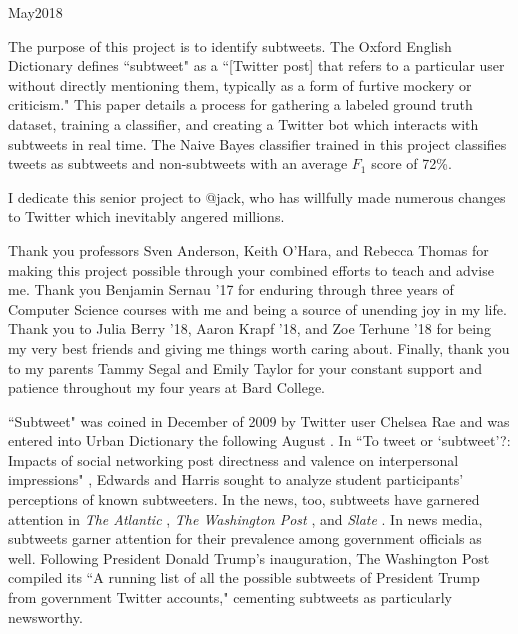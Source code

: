 \documentclass[11pt, twoside, reqno]{book}
\begin{document}
    {May}{2018}

\abstr

The purpose of this project is to identify subtweets. The Oxford English Dictionary defines ``subtweet" as a ``[Twitter post] that refers to a particular user without directly mentioning them, typically as a form of furtive mockery or criticism." This paper details a process for gathering a labeled ground truth dataset, training a classifier, and creating a Twitter bot which interacts with subtweets in real time. The Naive Bayes classifier trained in this project classifies tweets as subtweets and non-subtweets with an average $F_{1}$ score of 72\%. 

\tableofcontents

\dedic

I dedicate this senior project to @jack, who has willfully made numerous changes to Twitter which inevitably angered millions.

\acknowl

Thank you professors Sven Anderson, Keith O'Hara, and Rebecca Thomas for making this project possible through your combined efforts to teach and advise me. Thank you Benjamin Sernau '17 for enduring through three years of Computer Science courses with me and being a source of unending joy in my life. Thank you to Julia Berry '18, Aaron Krapf '18, and Zoe Terhune '18 for being my very best friends and giving me things worth caring about. Finally, thank you to my parents Tammy Segal and Emily Taylor for your constant support and patience throughout my four years at Bard College. 

\startmain
\intro

``Subtweet" was coined in December of 2009 by Twitter user Chelsea Rae \cite{first_subtweet} and was entered into Urban Dictionary the following August \cite{urban_dictionary}. In ``To tweet or ‘subtweet’?: Impacts of social networking post directness and valence on interpersonal impressions" \cite{subtweets_communications}, Edwards and Harris sought to analyze student participants' perceptions of known subtweeters. In the news, too, subtweets have garnered attention in \textit{The Atlantic} \cite{the_atlantic}, \textit{The Washington Post} \cite{the_washington_post}, and \textit{Slate} \cite{slate}. In news media, subtweets garner attention for their prevalence among government officials as well. Following President Donald Trump's inauguration, The Washington Post compiled its ``A running list of all the possible subtweets of President Trump from government Twitter accounts," \cite{the_washington_post_trump} cementing subtweets as particularly newsworthy.
\end{document}
